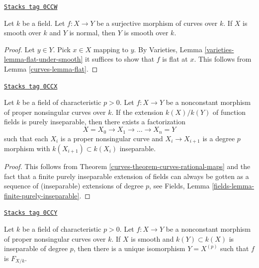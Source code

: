 \begin{lemma}
\label{curves-lemma-dominated-by-smooth}
\href{https://stacks.math.columbia.edu/tag/0CCW}{\texttt{Stacks tag 0CCW}}

Let $k$ be a field. Let $f : X \to Y$ be a surjective morphism
of curves over $k$. If $X$ is smooth over $k$ and
$Y$ is normal, then $Y$ is smooth over $k$.
\end{lemma}

\begin{proof}

Let $y \in Y$. Pick $x \in X$ mapping to $y$.
By Varieties, Lemma \ref{varieties-lemma-flat-under-smooth}
it suffices to show that $f$ is flat at $x$.
This follows from Lemma \ref{curves-lemma-flat}.
\end{proof}

\begin{lemma}
\label{curves-lemma-purely-inseparable}
\href{https://stacks.math.columbia.edu/tag/0CCX}{\texttt{Stacks tag 0CCX}}

Let $k$ be a field of characteristic $p > 0$. Let $f : X \to Y$ be a
nonconstant morphism of proper nonsingular curves over $k$.
If the extension $k(X)/k(Y)$ of function fields
is purely inseparable, then there exists a factorization
$$
X = X_0 \to X_1 \to \ldots \to X_n = Y
$$
such that each $X_i$ is a proper nonsingular curve
and $X_i \to X_{i + 1}$ is a degree $p$
morphism with $k(X_{i + 1}) \subset k(X_i)$
inseparable.
\end{lemma}

\begin{proof}

This follows from Theorem \ref{curves-theorem-curves-rational-maps}
and the fact that a finite purely inseparable extension of fields
can always be gotten as a sequence of (inseparable) extensions of degree $p$,
see Fields, Lemma \ref{fields-lemma-finite-purely-inseparable}.
\end{proof}

\begin{lemma}
\label{curves-lemma-inseparable-deg-p-smooth}
\href{https://stacks.math.columbia.edu/tag/0CCY}{\texttt{Stacks tag 0CCY}}

Let $k$ be a field of characteristic $p > 0$. Let $f : X \to Y$ be a
nonconstant morphism of proper nonsingular curves over $k$.
If $X$ is smooth and $k(Y) \subset k(X)$ is inseparable of degree $p$,
then there is a unique isomorphism $Y = X^{(p)}$ such that
$f$ is $F_{X/k}$.
\end{lemma}

